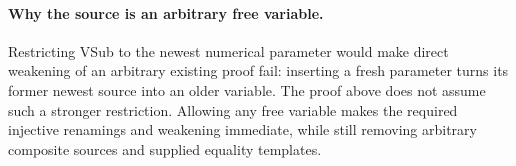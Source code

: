 \paragraph{Why the source is an arbitrary free variable.}
Restricting VSub to the newest numerical parameter would make direct
weakening of an arbitrary existing proof fail: inserting a fresh
parameter turns its former newest source into an older variable.
The proof above does not assume such a stronger restriction. Allowing
any free variable makes the required injective renamings and weakening
immediate, while still removing arbitrary composite sources and
supplied equality templates.
